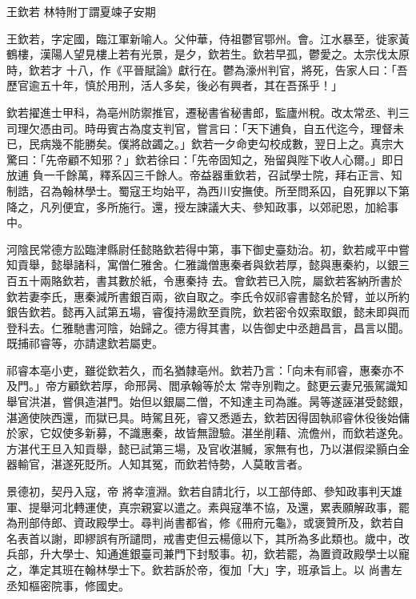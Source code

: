 
\begin{pinyinscope}

 王欽若
 林特附丁謂夏竦子安期



 王欽若，字定國，臨江軍新喻人。父仲華，侍祖鬱官鄂州。會。江水暴至，徙家黃鶴樓，漢陽人望見樓上若有光景，是夕，欽若生。欽若早孤，鬱愛之。太宗伐太原時，欽若才
 十八，作《平晉賦論》獻行在。鬱為濠州判官，將死，告家人曰：「吾歷官逾五十年，慎於用刑，活人多矣，後必有興者，其在吾孫乎！」



 欽若擢進士甲科，為亳州防禦推官，遷秘書省秘書郎，監廬州稅。改太常丞、判三司理欠憑由司。時毋賓古為度支判官，嘗言曰：「天下逋負，自五代迄今，理督未已，民病幾不能勝矣。僕將啟蠲之。」欽若一夕命吏勾校成數，翌日上之。真宗大驚曰：「先帝顧不知邪？」欽若徐曰：「先帝固知之，殆留與陛下收人心爾。」即日放逋
 負一千餘萬，釋系囚三千餘人。帝益器重欽若，召試學士院，拜右正言、知制誥，召為翰林學士。蜀寇王均始平，為西川安撫使。所至問系囚，自死罪以下第降之，凡列便宜，多所施行。還，授左諫議大夫、參知政事，以郊祀恩，加給事中。



 河陰民常德方訟臨津縣尉任懿賂欽若得中第，事下御史臺劾治。初，欽若咸平中嘗知貢舉，懿舉諸科，寓僧仁雅舍。仁雅識僧惠秦者與欽若厚，懿與惠秦約，以銀三百五十兩賂欽若，書其數於紙，令惠秦持
 去。會欽若已入院，屬欽若客納所書於欽若妻李氏，惠秦減所書銀百兩，欲自取之。李氏令奴祁睿書懿名於臂，並以所約銀告欽若。懿再入試第五場，睿復持湯飲至貢院，欽若密令奴索取銀，懿未即與而登科去。仁雅馳書河陰，始歸之。德方得其書，以告御史中丞趙昌言，昌言以聞。既捕祁睿等，亦請逮欽若屬吏。



 祁睿本亳小吏，雖從欽若久，而名猶隸亳州。欽若乃言：「向未有祁睿，惠秦亦不及門。」帝方顧欽若厚，命邢昺、閻承翰等於太
 常寺別鞫之。懿更云妻兄張駕識知舉官洪湛，嘗俱造湛門。始但以銀屬二僧，不知達主司為誰。昺等遂誣湛受懿銀，湛適使陜西還，而獄已具。時駕且死，睿又悉遁去，欽若因得固執祁睿休役後始傭於家，它奴使多新募，不識惠秦，故皆無證驗。湛坐削藉、流儋州，而欽若遂免。方湛代王旦入知貢舉，懿已試第三場，及官收湛贓，家無有也，乃以湛假梁顥白金器輸官，湛遂死貶所。人知其冤，而欽若恃勢，人莫敢言者。



 景德初，契丹入寇，帝
 將幸澶淵。欽若自請北行，以工部侍郎、參知政事判天雄軍、提舉河北轉運使，真宗親宴以遣之。素與寇準不協，及還，累表願解政事，罷為刑部侍郎、資政殿學士。尋判尚書都省，修《冊府元龜》，或褒贊所及，欽若自名表首以謝，即繆誤有所譴問，戒書吏但云楊億以下，其所為多此類也。歲中，改兵部，升大學士、知通進銀臺司兼門下封駁事。初，欽若罷，為置資政殿學士以寵之，準定其班在翰林學士下。欽若訴於帝，復加「大」字，班承旨上。以
 尚書左丞知樞密院事，修國史。




\end{pinyinscope}

